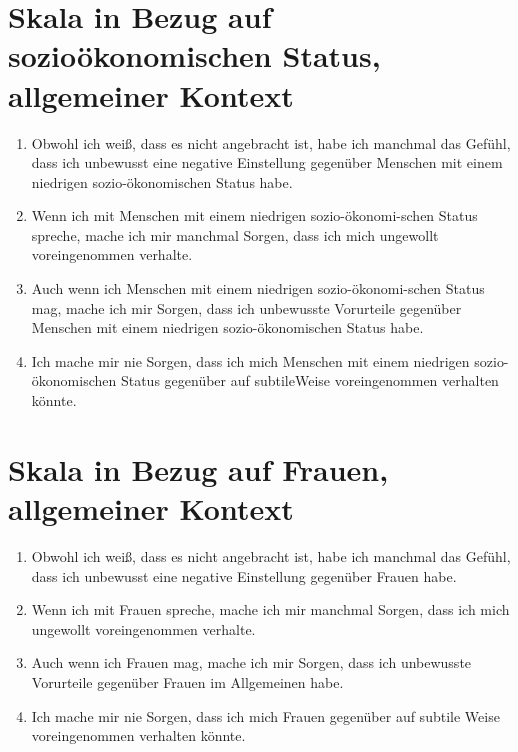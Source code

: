 \section*{Skala in Bezug auf sozioökonomischen Status, allgemeiner Kontext}
\label{app:skala-sozoek-allg}

\begin{enumerate}
	\item Obwohl ich weiß, dass es nicht angebracht ist, habe ich manchmal das Gefühl, dass ich unbewusst eine negative Einstellung gegenüber Menschen mit einem niedrigen sozio-ökonomischen Status habe.
	
	\item Wenn ich mit Menschen mit einem niedrigen sozio-ökonomi-\break schen Status spreche, mache ich mir manchmal Sorgen, dass ich mich ungewollt voreingenommen verhalte.
	
	\item Auch wenn ich Menschen mit einem niedrigen sozio-ökonomi-\break schen Status mag, mache ich mir Sorgen, dass ich unbewusste Vorurteile gegenüber Menschen mit einem niedrigen sozio-\break ökonomischen Status habe.
	
	\item Ich mache mir nie Sorgen, dass ich mich Menschen mit einem niedrigen sozio-ökonomischen Status gegenüber auf subtile\break Weise voreingenommen verhalten könnte.
\end{enumerate}


\section*{Skala in Bezug auf Frauen, allgemeiner Kontext}
\label{app:skala-frauen-allg}

\begin{enumerate}
	\item Obwohl ich weiß, dass es nicht angebracht ist, habe ich manchmal das Gefühl, dass ich unbewusst eine negative Einstellung gegenüber Frauen habe.
	
	\item Wenn ich mit Frauen spreche, mache ich mir manchmal Sorgen, dass ich mich ungewollt voreingenommen verhalte.
	
	\item Auch wenn ich Frauen mag, mache ich mir Sorgen, dass ich unbewusste Vorurteile gegenüber Frauen im Allgemeinen habe.
	
	\item Ich mache mir nie Sorgen, dass ich mich Frauen gegenüber auf subtile Weise voreingenommen verhalten könnte.
\end{enumerate}


